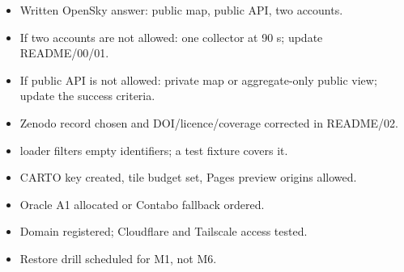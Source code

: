 \documentclass[10.5pt]{article}
\begin{document}
\vspace{5pt}
\newpage
{}

\begin{card}
\begin{itemize}[leftmargin=1.55em,itemsep=3pt,topsep=2pt]
  \item[$\square$] Written OpenSky answer: public map, public API, two accounts.
  \item[$\square$] If two accounts are not allowed: one collector at 90 s; update README/00/01.
  \item[$\square$] If public API is not allowed: private map or aggregate-only public view; update the success criteria.
  \item[$\square$] Zenodo record chosen and DOI/licence/coverage corrected in README/02.
  \item[$\square$]  loader filters empty identifiers; a test fixture covers it.
  \item[$\square$] CARTO key created, tile budget set, Pages preview origins allowed.
  \item[$\square$] Oracle A1 allocated or Contabo fallback ordered.
  \item[$\square$] Domain registered; Cloudflare and Tailscale access tested.
  \item[$\square$] Restore drill scheduled for M1, not M6.
\end{itemize}
\end{card}
\end{document}
